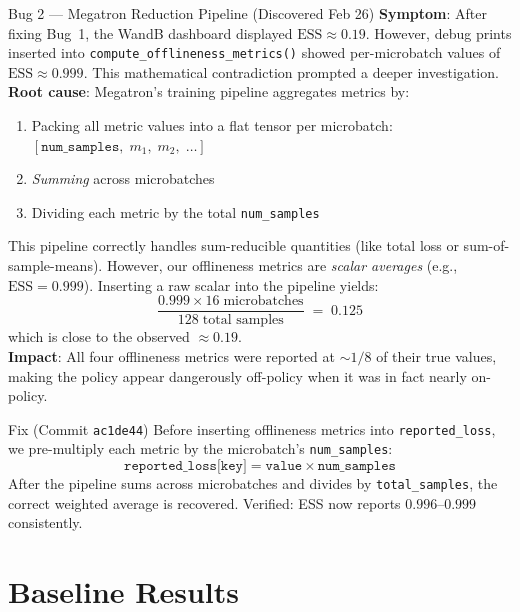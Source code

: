 \documentclass[11pt,a4paper]{article}
\begin{document}
\begin{bugbox}{Bug 2 --- Megatron Reduction Pipeline (Discovered Feb 26)}
\textbf{Symptom}: After fixing Bug~1, the WandB dashboard displayed
  $\mathrm{ESS} \approx 0.19$. However, debug prints inserted into
  \texttt{compute\_offlineness\_metrics()} showed per-microbatch values of
  $\mathrm{ESS} \approx 0.999$. This mathematical contradiction prompted a
  deeper investigation.\\[0.3em]
\textbf{Root cause}: Megatron's training pipeline aggregates metrics by:
  \begin{enumerate}[leftmargin=1.5em, topsep=0.2em]
    \item Packing all metric values into a flat tensor per microbatch:
          $[\texttt{num\_samples},\; m_1,\; m_2,\; \ldots]$
    \item \emph{Summing} across microbatches
    \item Dividing each metric by the total \texttt{num\_samples}
  \end{enumerate}
  This pipeline correctly handles sum-reducible quantities (like total loss or
  sum-of-sample-means). However, our offlineness metrics are \emph{scalar
  averages} (e.g., $\mathrm{ESS} = 0.999$). Inserting a raw scalar into the
  pipeline yields:
  \[
    \frac{0.999 \times 16\;\text{microbatches}}{128\;\text{total samples}}
    \;=\; 0.125
  \]
  which is close to the observed $\approx 0.19$.\\[0.3em]
\textbf{Impact}: All four offlineness metrics were reported at $\sim\!1/8$ of
  their true values, making the policy appear dangerously off-policy when it was
  in fact nearly on-policy.
\end{bugbox}

\begin{fixbox}{Fix (Commit \texttt{ac1de44})}
Before inserting offlineness metrics into \texttt{reported\_loss}, we
  pre-multiply each metric by the microbatch's \texttt{num\_samples}:
  \[
    \texttt{reported\_loss[key]} = \texttt{value} \times \texttt{num\_samples}
  \]
  After the pipeline sums across microbatches and divides by
  \texttt{total\_samples}, the correct weighted average is recovered. Verified:
  ESS now reports $0.996$--$0.999$ consistently.
\end{fixbox}


\section{Baseline Results}
\label{sec:baseline}
\end{document}
